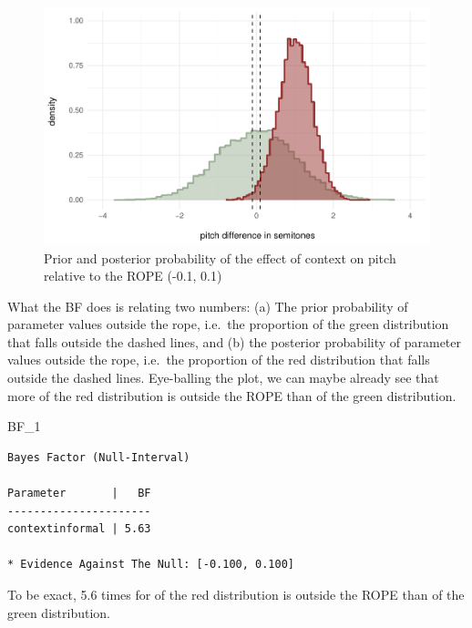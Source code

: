 \documentclass[
  doc,
  longtable,
  nolmodern,
  notxfonts,
  notimes,
  colorlinks=true,linkcolor=blue,citecolor=blue,urlcolor=blue]{apa7}
\newenvironment{Shaded}{\begin{snugshade}}{\end{snugshade}}
\newcommand{\NormalTok}[1]{\textcolor[rgb]{0.00,0.23,0.31}{#1}}
\begin{document}
\begin{figure}[H]

\caption{Prior and posterior probability of the effect of context on
pitch relative to the ROPE (-0.1, 0.1)}

{\centering \includegraphics{manuscript_files/figure-pdf/plot-ropes-1.pdf}

}

\end{figure}%

What the BF does is relating two numbers: (a) The prior probability of
parameter values outside the rope, i.e.~the proportion of the green
distribution that falls outside the dashed lines, and (b) the posterior
probability of parameter values outside the rope, i.e.~the proportion of
the red distribution that falls outside the dashed lines. Eye-balling
the plot, we can maybe already see that more of the red distribution is
outside the ROPE than of the green distribution.

\begin{Shaded}
\begin{Highlighting}[]
\NormalTok{BF\_1}
\end{Highlighting}
\end{Shaded}

\begin{verbatim}
Bayes Factor (Null-Interval)

Parameter       |   BF
----------------------
contextinformal | 5.63

* Evidence Against The Null: [-0.100, 0.100]
\end{verbatim}

To be exact, 5.6 times for of the red distribution is outside the ROPE
than of the green distribution.
\end{document}
